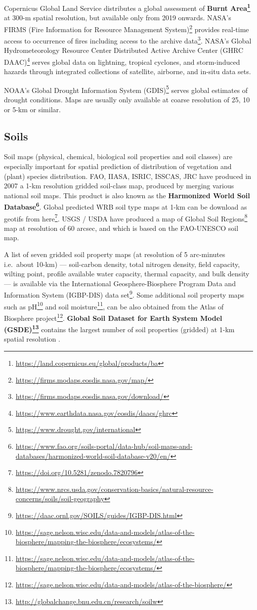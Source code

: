 \documentclass[
  graybox,natbib,nospthms]{svmono}
\renewcommand{\href}[2]{#2 (\url{#1})}
\renewcommand{\href}[2]{#2\footnote{\url{#1}}}
\begin{document}
Copernicus Global Land Service distributes a global assessment of \textbf{\href{https://land.copernicus.eu/global/products/ba}{Burnt Area}}
at 300-m spatial resolution, but available only from 2019 onwards.
NASA's \href{https://firms.modaps.eosdis.nasa.gov/map/}{FIRMS (Fire Information for Resource Management System)} provides
real-time access to occurrence of fires including access to the \href{https://firms.modaps.eosdis.nasa.gov/download/}{archive data}.
\href{https://www.earthdata.nasa.gov/eosdis/daacs/ghrc}{NASA's Global Hydrometeorology Resource Center Distributed Active Archive Center (GHRC DAAC)} serves global data on
lightning, tropical cyclones, and storm-induced hazards through integrated collections of satellite, airborne, and in-situ data sets.

NOAA's \href{https://www.drought.gov/international}{Global Drought Information System (GDIS)} serves global estimates of drought conditions.
Maps are usually only available at coarse resolution of 25, 10 or 5-km or similar.

\hypertarget{soils}{%
\subsection{Soils}\label{soils}}

Soil maps (physical, chemical, biological soil properties and soil classes) are especially important for spatial prediction of distribution
of vegetation and (plant) species distribution.
FAO, IIASA, ISRIC, ISSCAS, JRC have produced in 2007 a 1-km resolution gridded
soil-class map, produced by merging various national soil maps. This product is
also known as the \textbf{\href{https://www.fao.org/soils-portal/data-hub/soil-maps-and-databases/harmonized-world-soil-database-v20/en/}{Harmonized World Soil Database}}.
Global predicted WRB soil type maps at 1-km can be download as geotifs from \href{https://doi.org/10.5281/zenodo.7820796}{here}.
USGS / USDA have produced a map of \href{https://www.nrcs.usda.gov/conservation-basics/natural-resource-concerns/soils/soil-geography}{Global Soil Regions}
map at resolution of 60 arcsec, and which is based on the FAO-UNESCO soil map.

A list of seven gridded soil property maps (at resolution of 5 arc-minutes i.e.~about 10-km) ---
soil-carbon density, total nitrogen density, field capacity, wilting point, profile
available water capacity, thermal capacity, and bulk density --- is available via the \href{https://daac.ornl.gov/SOILS/guides/IGBP-DIS.html}{International Geosphere-Biosphere Program Data and Information System (IGBP-DIS) data set}. Some additional soil property maps such as \href{https://sage.nelson.wisc.edu/data-and-models/atlas-of-the-biosphere/mapping-the-biosphere/ecosystems/}{pH} and \href{https://sage.nelson.wisc.edu/data-and-models/atlas-of-the-biosphere/mapping-the-biosphere/ecosystems/}{soil moisture}, can
be also obtained from the \href{https://sage.nelson.wisc.edu/data-and-models/atlas-of-the-biosphere/}{Atlas of Biosphere project}.
\textbf{\href{http://globalchange.bnu.edu.cn/research/soilw}{Global Soil Dataset for Earth System Model (GSDE)}} contains the largest
number of soil properties (gridded) at 1-km spatial resolution \citep{Shangguan2014}.
\end{document}

